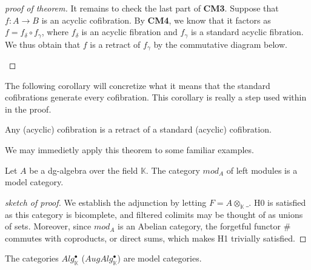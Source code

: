\documentclass[../thesis.tex]{subfiles}
\begin{document}
\begin{proof}[proof of theorem]
                It remains to check the last part of \textbf{CM3}. Suppose that $f:A\rightarrow B$ is an acyclic cofibration. By \textbf{CM4}, we know that it factors as $f = f_\delta \circ f_\gamma$, where $f_\delta$ is an acyclic fibration and $f_\gamma$ is a standard acyclic fibration. We thus obtain that $f$ is a retract of $f_\gamma$ by the commutative diagram below.
                \begin{center}
                \end{center}
            \end{proof}

            The following corollary will concretize what it means that the standard cofibrations generate every cofibration. This corollary is really a step used within in the proof.

            \begin{corollary}
                Any (acyclic) cofibration is a retract of a standard (acyclic) cofibration.
            \end{corollary}

            We may immedietly apply this theorem to some familiar examples.

            \begin{corollary}
                Let $A$ be a dg-algebra over the field $\mathbb{K}$. The category $mod_A$ of left modules is a model category.
            \end{corollary}

            \begin{proof}[sketch of proof]
                We establish the adjunction by letting $F = A\otimes_\mathbb{K}\_$. H0 is satisfied as this category is bicomplete, and filtered colimits may be thought of as unions of sets. Moreover, since $mod_A$ is an Abelian category, the forgetful functor $\#$ commutes with coproducts, or direct sums, which makes H1 trivially satisfied.
            \end{proof}

            \begin{corollary}
                The categories $Alg^\bullet_\mathbb{K}$ ($AugAlg^\bullet_\mathbb{K}$) are model categories.
            \end{corollary}
\end{document}

